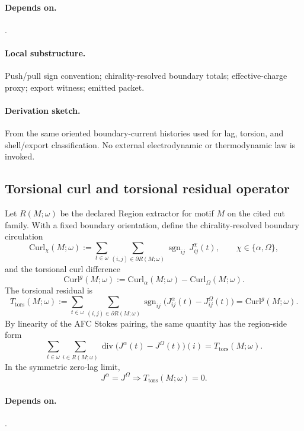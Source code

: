 \paragraph{Depends on.} .
\paragraph{Local substructure.} Push/pull sign convention; chirality-resolved boundary totals; effective-charge proxy; export witness; emitted packet.
\paragraph{Derivation sketch.} From the same oriented boundary-current histories used for lag, torsion, and shell/export classification. No external electrodynamic or thermodynamic law is invoked.

\subsection{Torsional curl and torsional residual operator}\label{subsec:torsional-operators}
\begin{definition}
\label{def:torsional-operator}
Let $R(M;\omega)$ be the declared Region extractor for motif $M$ on the cited cut family. With a fixed boundary orientation, define the chirality-resolved boundary circulation
\[
\mathrm{Curl}_{\chi}(M;\omega):=
\sum_{t\in\omega}\sum_{(i,j)\in\partial R(M;\omega)}
\operatorname{sgn}_{ij}\,J^{\chi}_{ij}(t),
\qquad \chi\in\{\alpha,\Omega\},
\]
and the torsional curl difference
\[
\mathrm{Curl}^{g}(M;\omega):=\mathrm{Curl}_{\alpha}(M;\omega)-\mathrm{Curl}_{\Omega}(M;\omega).
\]
The torsional residual is
\[
T_{\mathrm{tors}}(M;\omega):=
\sum_{t\in\omega}\sum_{(i,j)\in\partial R(M;\omega)}
\operatorname{sgn}_{ij}\bigl(J^{\alpha}_{ij}(t)-J^{\Omega}_{ij}(t)\bigr)
= \mathrm{Curl}^{g}(M;\omega).
\]
By linearity of the AFC Stokes pairing, the same quantity has the region-side form
\[
\sum_{t\in\omega}\sum_{i\in R(M;\omega)}
\operatorname{div}\!\bigl(J^{\alpha}(t)-J^{\Omega}(t)\bigr)(i)
= T_{\mathrm{tors}}(M;\omega).
\]
In the symmetric zero-lag limit,
\[
J^{\alpha}=J^{\Omega}\Longrightarrow T_{\mathrm{tors}}(M;\omega)=0.
\]
\end{definition}

\paragraph{Depends on.} .
